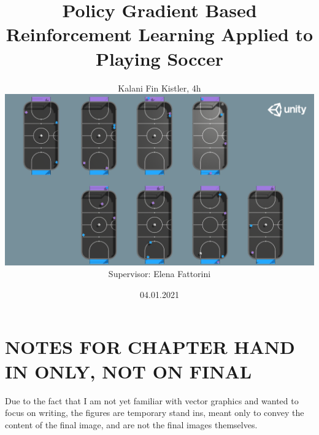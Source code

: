 \documentclass[a4paper,openright]{scrreprt}
\title{Policy Gradient Based Reinforcement Learning Applied to Playing Soccer}
\author{\texorpdfstring{Kalani Fin Kistler, 4h \\[1cm]\includegraphics[scale=0.2]{figures/Screenshot from 2020-09-22 23-05-59.png}\\[1cm] {\small Supervisor: Elena Fattorini}}{Kalani Fin Kistler 4h}}
\date{\small 04.01.2021}
\begin{document}
\maketitle %
\cleardoublepage
{} %
\tableofcontents %
\cleardoublepage %


\chapter*{NOTES FOR CHAPTER HAND IN ONLY, NOT ON FINAL}
Due to the fact that I am not yet familiar with vector graphics and wanted to focus on writing, the figures are temporary stand ins, meant only to convey the content of the final image, and are not the final images themselves.








\appendix
\listoffigures 
\listoftables 

\end{document}
